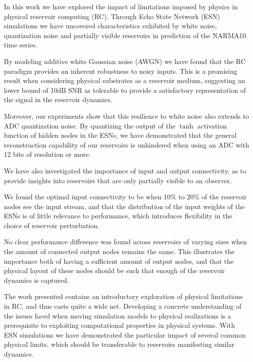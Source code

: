 In this work we have explored the impact of limitations imposed by physics in
physical reservoir computing (RC). Through Echo State Network (ESN) simulations
we have uncovered characteristics exhibited by white noise, quantization noise
and partially visible reservoirs in prediction of the NARMA10 time series.

By modeling additive white Gaussian noise (AWGN) we have found that the RC
paradigm provides an inherent robustness to noisy inputs. This is a promising
result when considering physical substrates as a reservoir medium, suggesting an
lower bound of 10dB SNR as tolerable to provide a satisfactory representation of
the signal in the reservoir dynamics.

Moreover, our experiments show that this resilience to white noise also extends
to ADC quantization noise. By quantizing the output of the $\tanh$ activation
function of hidden nodes in the ESNs, we have demonstrated that the general
reconstruction capability of our reservoirs is unhindered when using an ADC with
12 bits of resolution or more.

We have also investigated the importance of input and output connectivity, as to
provide insights into reservoirs that are only partially visible to an
observer.

We found the optimal input connectivity to be when 10\% to 20\% of the reservoir
nodes see the input stream, and that the distribution of the input weights of
the ESNs is of little relevance to performance, which introduces flexibility in
the choice of reservoir perturbation.

No clear performance difference was found across reservoirs of varying sizes
when the amount of connected output nodes remains the same. This illustrates the
importance both of having a sufficient amount of output nodes, and that the
physical layout of these nodes should be such that enough of the reservoir
dynamics is captured.

The work presented contains an introductory exploration of physical limitations
in RC, and thus casts quite a wide net. Developing a concrete understanding of
the issues faced when moving simulation models to physical realizations is a
prerequisite to exploiting computational properties in physical systems. With
ESN simulations we have demonstrated the particular impact of several common
physical limits, which should be transferable to reservoirs manifesting similar
dynamics.

